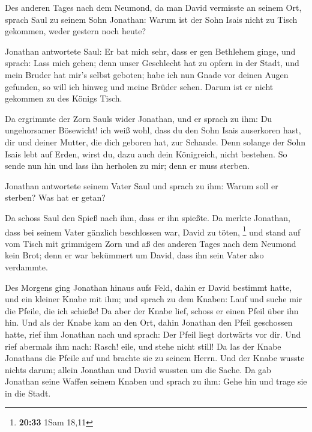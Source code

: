  Des anderen Tages nach dem Neumond, da man David vermisste
an seinem Ort, sprach Saul zu seinem Sohn Jonathan: Warum ist der Sohn
Isais nicht zu Tisch gekommen, weder gestern noch heute?

 Jonathan antwortete Saul: Er bat mich sehr, dass er gen
Bethlehem ginge,  und sprach: Lass mich gehen; denn unser
Geschlecht hat zu opfern in der Stadt, und mein Bruder hat mir's selbst
geboten; habe ich nun Gnade vor deinen Augen gefunden, so will ich
hinweg und meine Brüder sehen. Darum ist er nicht gekommen zu des Königs
Tisch.

 Da ergrimmte der Zorn Sauls wider Jonathan, und er sprach
zu ihm: Du ungehorsamer Bösewicht! ich weiß wohl, dass du den Sohn Isais
auserkoren hast, dir und deiner Mutter, die dich geboren hat, zur
Schande.  Denn solange der Sohn Isais lebt auf Erden, wirst
du, dazu auch dein Königreich, nicht bestehen. So sende nun hin und lass
ihn herholen zu mir; denn er muss sterben.

 Jonathan antwortete seinem Vater Saul und sprach zu ihm:
Warum soll er sterben? Was hat er getan?

 Da schoss Saul den Spieß nach ihm, dass er ihn spießte. Da
merkte Jonathan, dass bei seinem Vater gänzlich beschlossen war, David
zu töten, \footnote{\textbf{20:33} 1Sam 18,11}  und stand
auf vom Tisch mit grimmigem Zorn und aß des anderen Tages nach dem
Neumond kein Brot; denn er war bekümmert um David, dass ihn sein Vater
also verdammte.

 Des Morgens ging Jonathan hinaus aufs Feld, dahin er David
bestimmt hatte, und ein kleiner Knabe mit ihm;  und sprach
zu dem Knaben: Lauf und suche mir die Pfeile, die ich schieße! Da aber
der Knabe lief, schoss er einen Pfeil über ihn hin.  Und
als der Knabe kam an den Ort, dahin Jonathan den Pfeil geschossen hatte,
rief ihm Jonathan nach und sprach: Der Pfeil liegt dortwärts vor dir.
 Und rief abermals ihm nach: Rasch! eile, und stehe nicht
still! Da las der Knabe Jonathans die Pfeile auf und brachte sie zu
seinem Herrn.  Und der Knabe wusste nichts darum; allein
Jonathan und David wussten um die Sache.  Da gab Jonathan
seine Waffen seinem Knaben und sprach zu ihm: Gehe hin und trage sie in
die Stadt.

